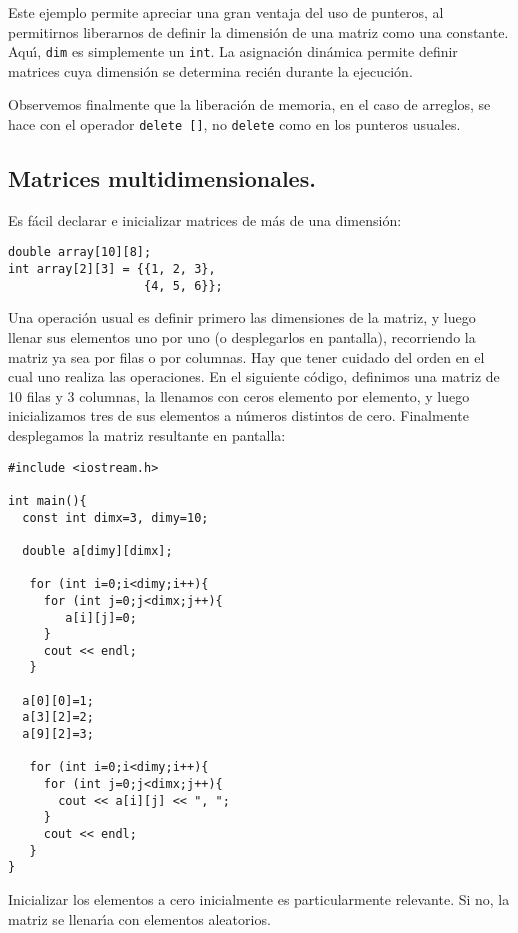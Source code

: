 Este ejemplo permite apreciar una gran ventaja del uso de punteros, al
permitirnos liberarnos de definir la dimensi\'on de una matriz como
una constante. Aqu\'{\i}, \verb+dim+ es simplemente un \verb+int+. 
La asignaci\'on
din\'amica permite definir matrices cuya dimensi\'on se determina
reci\'en durante la ejecuci\'on. 

Observemos finalmente que la liberaci\'on de memoria, en el caso de
arreglos, se hace con el operador \verb+delete []+, no \verb+delete+
como en los punteros usuales.


\subsection{Matrices multidimensionales.}

Es f{\'a}cil declarar e inicializar matrices de m{\'a}s de una
dimensi{\'o}n: 
\begin{verbatim}
double array[10][8];
int array[2][3] = {{1, 2, 3}, 
                   {4, 5, 6}};
\end{verbatim}

Una operaci\'on usual es definir primero las dimensiones de la matriz,
y luego llenar sus elementos uno por uno (o desplegarlos en pantalla),
recorriendo la matriz ya sea por filas o por columnas. Hay que tener
cuidado del orden en el cual uno realiza las operaciones. En el
siguiente c\'odigo, definimos una matriz de 10 filas y 3 columnas, la
llenamos con ceros elemento por elemento, y luego inicializamos tres
de sus elementos a n\'umeros distintos de cero. Finalmente desplegamos
la matriz resultante en pantalla:

\begin{verbatim}
#include <iostream.h>

int main(){
  const int dimx=3, dimy=10;

  double a[dimy][dimx];

   for (int i=0;i<dimy;i++){
     for (int j=0;j<dimx;j++){
        a[i][j]=0;
     }
     cout << endl;
   }

  a[0][0]=1;
  a[3][2]=2;
  a[9][2]=3;

   for (int i=0;i<dimy;i++){
     for (int j=0;j<dimx;j++){
       cout << a[i][j] << ", ";
     }
     cout << endl;
   }
}
\end{verbatim}

Inicializar los elementos a cero inicialmente es particularmente
relevante. Si no, la matriz se llenar\'{\i}a con elementos
aleatorios. 

